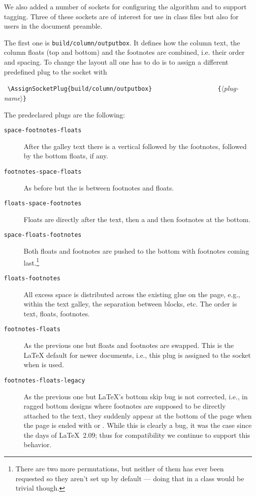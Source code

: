 \documentclass{ltnews}
\providecommand\socket[1]{\texttt{#1}}
\providecommand\plug[1]{\texttt{#1}}
\providecommand\meta[1]{$\langle$\textrm{\itshape#1}$\rangle$}
\begin{document}
We also added a number of sockets for configuring the algorithm and to
support tagging. Three of these sockets are of interest for use in
class files but also for users in the document preamble.

The first one is \socket{build/column/outputbox}. It defines how the
column text, the column floats (top and bottom) and the footnotes are
combined, i.e. their order and spacing. To change the layout all one
has to do is to assign a different predefined plug to the socket with
\begin{flushleft}
  \verb= \AssignSocketPlug{build/column/outputbox}=
  \verb=                  {=\meta{plug-name}\verb=}=
\end{flushleft}
The predeclared plugs are the following:
\begin{description}
\item[\plug{space-footnotes-floats}]

   After the galley text there is a vertical 
   followed by the footnotes, followed by the bottom floats, if any.

\item[\plug{footnotes-space-floats}]

   As before but the  is between footnotes and floats.

\item[\plug{floats-space-footnotes}]

   Floats are directly after the text, then a  and then footnotes
   at the bottom.

\item[\plug{space-floats-footnotes}]

   Both floats and footnotes are pushed to the bottom with footnotes
   coming last.\footnote{There are two more permutations, but neither
   of them has ever been requested so they aren't set up by default
   --- doing that in a class would be trivial though.}

\item[\plug{floats-footnotes}]

   All excess space is distributed across the existing
   glue on the page, e.g., within the text galley, the
   separation between blocks, etc.
   The order is text, floats, footnotes.

\item[\plug{footnotes-floats}]

   As the previous one but floats and footnotes are swapped. This is
   the \LaTeX{} default for newer documents, i.e., this plug is
   assigned to the socket when  is used.

\item[\plug{footnotes-floats-legacy}]

   As the previous one but \LaTeX{}'s bottom skip bug is not
   corrected, i.e., in ragged bottom designs where footnotes
   are supposed to be directly attached to the text, they suddenly
   appear at the bottom of the page when the page is ended with
    or .
   While this is clearly a bug, it was the case since the days
   of \LaTeX~2.09; thus for
   compatibility we continue to support this behavior.
\end{description}
\end{document}
